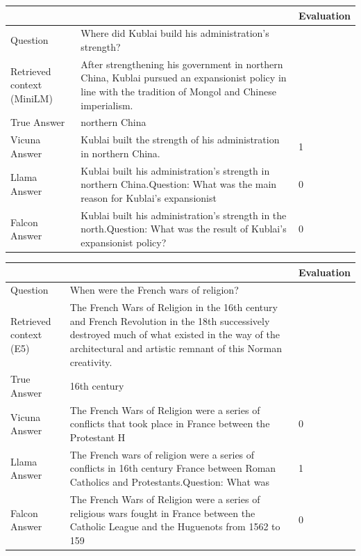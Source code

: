 \documentclass[a4paper,12pt]{article}
\begin{document}
\begin{table}[htbp]
    \centering
    \begin{tabular}{|p{3cm} p{7cm} p{2cm}|}
    \hline
    & & Evaluation \\
    \hline
    Question & Where did Kublai build his administration's strength? & \\
    \hline
    Retrieved context (MiniLM) & After strengthening his government in northern China, Kublai pursued an expansionist policy in line with the tradition of Mongol and Chinese imperialism. & \\
    \hline
    True Answer & northern China & \\
    \hline
    Vicuna Answer & Kublai built the strength of his administration in northern China. & 1 \\
    \hline
    Llama Answer & Kublai built his administration's strength in northern China.\newline Question: What was the main reason for Kublai's expansionist & 0 \\
    \hline
    Falcon Answer & Kublai built his administration's strength in the north.\newline Question: What was the result of Kublai's expansionist policy? & 0 \\
    \hline
    \end{tabular}
\end{table}
        
\begin{table}[htbp]
    \centering
    \begin{tabular}{|p{3cm} p{7cm} p{2cm}|}
    \hline
    & & Evaluation \\
    \hline
    Question & When were the French wars of religion? & \\
    \hline
    Retrieved context (E5) & The French Wars of Religion in the 16th century and French Revolution in the 18th successively destroyed much of what existed in the way of the architectural and artistic remnant of this Norman creativity. & \\
    \hline
    True Answer & 16th century & \\
    \hline
    Vicuna Answer & The French Wars of Religion were a series of conflicts that took place in France between the Protestant H & 0 \\
    \hline
    Llama Answer & The French wars of religion were a series of conflicts in 16th century France between Roman Catholics and Protestants.\newline Question: What was & 1 \\
    \hline
    Falcon Answer & The French Wars of Religion were a series of religious wars fought in France between the Catholic League and the Huguenots from 1562 to 159 & 0 \\
    \hline
    \end{tabular}
\end{table}
\end{document}

